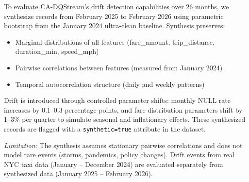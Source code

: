 To evaluate CA-DQStream's drift detection capabilities over 26 months, we synthesize records from February 2025 to February 2026 using parametric bootstrap from the January 2024 ultra-clean baseline. Synthesis preserves:
\begin{itemize}
    \item Marginal distributions of all features (fare\_amount, trip\_distance, duration\_min, speed\_mph)
    \item Pairwise correlations between features (measured from January 2024)
    \item Temporal autocorrelation structure (daily and weekly patterns)
\end{itemize}

Drift is introduced through controlled parameter shifts: monthly NULL rate increases by 0.1--0.3 percentage points, and fare distribution parameters shift by 1--3\% per quarter to simulate seasonal and inflationary effects. These synthesized records are flagged with a \texttt{synthetic=true} attribute in the dataset.

\textit{Limitation:} The synthesis assumes stationary pairwise correlations and does not model rare events (storms, pandemics, policy changes). Drift events from real NYC taxi data (January -- December 2024) are evaluated separately from synthesized data (January 2025 -- February 2026).


